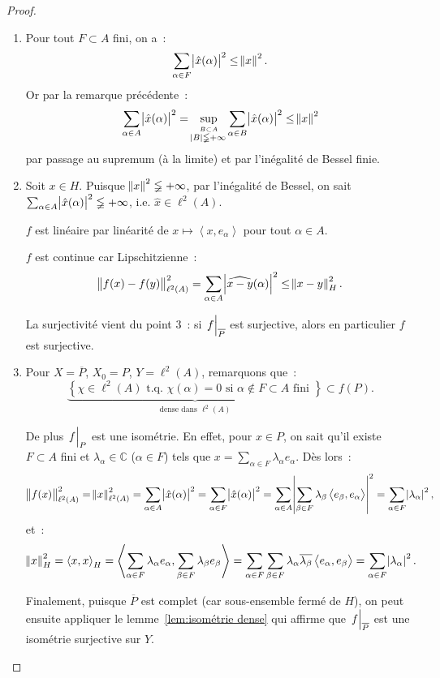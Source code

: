 \documentclass{report}
\newcommand{\C}{{\mathbb C}}
\newcommand{\scpr}[2]{\left\langle#1, #2\right\rangle}
\newcommand{\tq}{\text{ t.q. }}
\newcommand{\pinfty}{{+\infty}}
\newcommand{\restr}[2]{\left.#1\vphantom{\big|}\right|_{#2}}
\theoremstyle{definition}
\theoremstyle{remark}
\begin{document}
\begin{proof}~
\begin{enumerate}
	\item Pour tout $F \subset A$ fini, on a~:
	\[\sum_{\alpha \in F}\abs {\hat x(\alpha)}^2 \leq \norm x^2.\]
	Or par la remarque précédente~:
	\[\sum_{\alpha \in A}\abs {\hat x(\alpha)}^2 = \sup_{\stackrel {B \subset A}{\abs B \lneqq \pinfty}}\sum_{\alpha \in B}\abs {\hat x(\alpha)}^2 \leq \norm x^2\]
	par passage au supremum (à la limite) et par l'inégalité de Bessel finie.
	\item Soit $x \in H$. Puisque $\norm x^2 \lneqq \pinfty$, par l'inégalité de Bessel, on sait $\sum_{\alpha \in A}\abs {\hat x(\alpha)}^2 \lneqq \pinfty$, i.e. $\hat x \in \ell^2(A)$.

	$f$ est linéaire par linéarité de $x \mapsto \scpr x{e_\alpha}$ pour tout $\alpha \in A$.

	$f$ est continue car Lipschitzienne~:
	\[\norm {f(x)-f(y)}_{\ell^2(A)}^2 = \sum_{\alpha \in A}\abs {\widehat {x-y}(\alpha)}^2 \leq \norm {x-y}_H^2.\]

	La surjectivité vient du point 3~: si $\restr f{\overline P}$ est surjective, alors en particulier $f$ est surjective.
	\item Pour $X = \overline P$, $X_0 = P$, $Y = \ell^2(A)$, remarquons que~:
	\[\underbrace {\left\{\chi \in \ell^2(A) \tq \chi(\alpha) = 0 \text{ si } \alpha \not \in F \subset A \text{ fini }\right\}}_{\text{dense dans } \ell^2(A)} \subset f(P).\]

	De plus $\restr fP$ est une isométrie. En effet, pour $x \in P$, on sait qu'il existe $F \subset A$ fini et $\lambda_\alpha \in \C$ ($\alpha \in F$) tels que
	$x = \sum_{\alpha \in F}\lambda_\alpha e_\alpha$. Dès lors~:
	\[\norm {f(x)}_{\ell^2(A)}^2 = \norm x_{\ell^2(A)}^2 = \sum_{\alpha \in A}\abs {\hat x(\alpha)}^2 = \sum_{\alpha \in F}\abs {\hat x(\alpha)}^2
	= \sum_{\alpha \in A}\abs {\sum_{\beta \in F}\lambda_\beta \scpr {e_\beta}{e_\alpha}}^2 = \sum_{\alpha \in F}\abs {\lambda_\alpha}^2,\]
	et~:
	\[\norm x_H^2 = \scpr xx_H = \scpr {\sum_{\alpha \in F}\lambda_\alpha e_\alpha}{\sum_{\beta \in F}\lambda_\beta e_\beta}
	= \sum_{\alpha \in F}\sum_{\beta \in F}\lambda_\alpha\overline {\lambda_\beta}\scpr {e_\alpha}{e_\beta} = \sum_{\alpha \in F}\abs {\lambda_\alpha}^2.\]

	Finalement, puisque $\overline P$ est complet (car sous-ensemble fermé de $H$), on peut ensuite appliquer le lemme~\ref{lem:isométrie dense} qui affirme que
	$\restr f{\overline P}$ est une isométrie surjective sur $Y$.
\end{enumerate}
\end{proof}
\end{document}
